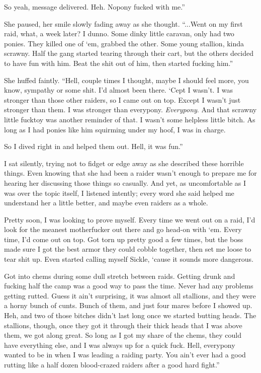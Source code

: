 \leavevmode{}So yeah, message delivered. Heh. Nopony fucked with me.”

She paused, her smile slowly fading away as she thought. “...Went on my first raid, what, a week later? I dunno. Some dinky little caravan, only had two ponies. They killed one of ‘em, grabbed the other. Some young stallion, kinda scrawny. Half the gang started tearing through their cart, but the others decided to have fun with him. Beat the shit out of him, then started fucking him.”

She huffed faintly. “Hell, couple times I thought, maybe I should feel more, you know, sympathy or some shit. I’d almost been there. ‘Cept I wasn’t. I was stronger than those other raiders, so I came out on top. Except I wasn’t just stronger than them. I was stronger than everypony. \textit{Everypony}. And that scrawny little fucktoy was another reminder of that. I wasn’t some helpless little bitch. As long as I had ponies like him squirming under my hoof, I was in charge.

\leavevmode{}So I dived right in and helped them out. Hell, it was fun.”

I sat silently, trying not to fidget or edge away as she described these horrible things. Even knowing that she had been a raider wasn’t enough to prepare me for hearing her discussing those things so casually. And yet, as uncomfortable as I was over the topic itself, I listened intently; every word she said helped me understand her a little better, and maybe even raiders as a whole.

\leavevmode{}Pretty soon, I was looking to prove myself. Every time we went out on a raid, I’d look for the meanest motherfucker out there and go head-on with ‘em. Every time, I’d come out on top. Got torn up pretty good a few times, but the boss made sure I got the best armor they could cobble together, then set me loose to tear shit up. Even started calling myself Sickle, ‘cause it sounds more dangerous.

\leavevmode{}Got into chems during some dull stretch between raids. Getting drunk and fucking half the camp was a good way to pass the time. Never had any problems getting rutted. Guess it ain’t surprising, it was almost all stallions, and they were a horny bunch of cunts. Bunch of them, and just four mares before I showed up. Heh, and two of those bitches didn’t last long once we started butting heads. The stallions, though, once they got it through their thick heads that I was above them, we got along great. So long as I got my share of the chems, they could have everything else, and I was always up for a quick fuck. Hell, everypony wanted to be in when I was leading a raiding party. You ain’t ever had a good rutting like a half dozen blood-crazed raiders after a good hard fight.”


